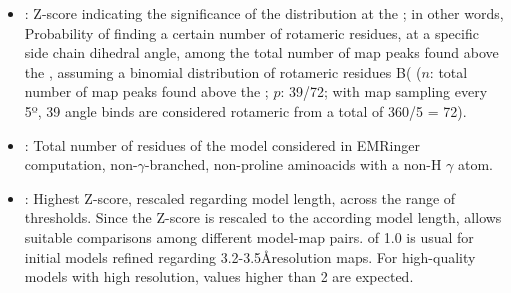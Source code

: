 \begin{itemize}
\begin{itemize}
\begin{itemize}
\begin{itemize}
          \item {}: Z-score indicating the significance of the distribution at the ; in other words, Probability of finding a certain number of rotameric residues, at a specific side chain dihedral angle, among the total number of map peaks found above the , assuming a binomial distribution of rotameric residues B( ($n$: total number of map peaks found above the ; $p$: 39/72; with map sampling every 5º, 39 angle binds are considered rotameric from a total of 360/5 = 72).
          \item {}: Total number of residues of the model considered in EMRinger computation, non-$\gamma$-branched, non-proline aminoacids with a non-H $\gamma$ atom.
          \item {}: Highest Z-score, rescaled regarding model length, across the range of  thresholds. Since the Z-score is rescaled to the  according model length,  allows suitable comparisons among different model-map pairs.  of 1.0 is usual for initial models refined regarding 3.2-3.5\AA resolution maps. For high-quality models with high resolution,  values higher than 2 are expected.
         \end{itemize}


\end{itemize}
\end{itemize}
\end{itemize}
